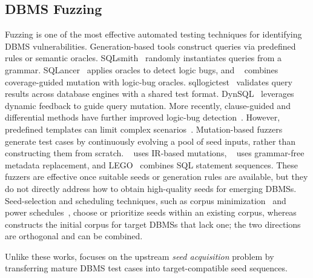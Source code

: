 \documentclass[conference]{IEEEtran}
\begin{document}
\subsection{DBMS Fuzzing}
Fuzzing is one of the most effective automated testing techniques for identifying DBMS vulnerabilities.
Generation-based tools construct queries via predefined rules or semantic oracles. 
SQLsmith~\cite{sqlsmith} randomly instantiates queries from a grammar. 
SQLancer~\cite{sqlancer,rigger2020testing} applies oracles to detect logic bugs, and \sqlright{}~\cite{sqlright} combines coverage-guided mutation with logic-bug oracles.
sqllogictest~\cite{sqllogictest} validates query results across database engines with a shared test format.
DynSQL~\cite{jiang2023dynsql} leverages dynamic feedback to guide query mutation. 
More recently, clause-guided and differential methods have further improved logic-bug detection~\cite{wei2024sqlaser, ba2023testing, song2023testing, cui2022differentially, hao2023pinolo}.
However, predefined templates can limit complex scenarios~\cite{gao2023comprehensive}. 
Mutation-based fuzzers generate test cases by continuously evolving a pool of seed inputs, rather than constructing them from scratch. 
\squirrel{}~\cite{zhong2020squirrel} uses IR-based mutations, \griffin{}~\cite{fu2022griffin} uses grammar-free metadata replacement, and LEGO~\cite{liang2023sequence} combines SQL statement sequences. 
These fuzzers are effective once suitable seeds or generation rules are available, but they do not directly address how to obtain high-quality seeds for emerging DBMSs.
Seed-selection and scheduling techniques, such as corpus minimization~\cite{herrera2021seed} and power schedules~\cite{aflfast}, choose or prioritize seeds within an existing corpus, whereas \tool{} constructs the initial corpus for target DBMSs that lack one; the two directions are orthogonal and can be combined.

Unlike these works, \tool{} focuses on the upstream \textit{seed acquisition} problem by transferring mature DBMS test cases into target-compatible seed sequences.
\end{document}
